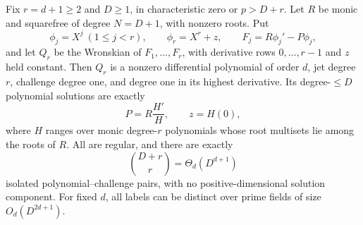 \begin{theorem}
\label{thm:isolated-lower}
Fix $r=d+1\ge2$ and $D\ge1$, in characteristic zero or $p>D+r$.
Let $R$ be monic and squarefree of degree $N=D+1$, with nonzero roots.
Put
\[
 \phi_j=X^j\ (1\le j<r),\qquad \phi_r=X^r+z,
 \qquad F_j=R\phi_j'-P\phi_j,
\]
and let $Q_r$ be the Wronskian of $F_1,\ldots,F_r$, with derivative
rows $0,\ldots,r-1$ and $z$ held constant. Then $Q_r$ is a nonzero
differential polynomial of order $d$, jet degree $r$, challenge
degree one, and degree one in its highest derivative.
Its degree-$\le D$ polynomial solutions are exactly
\[
 P=R\frac{H'}H,\qquad z=H(0),
\]
where $H$ ranges over monic degree-$r$ polynomials whose root multisets
lie among the roots of $R$. All are regular, and there are exactly
\[
 \binom{D+r}{r}=\Theta_d(D^{d+1})
\]
isolated polynomial--challenge pairs, with no positive-dimensional
solution component. For fixed $d$, all labels can be distinct over
prime fields of size $O_d(D^{2d+1})$.
\end{theorem}

